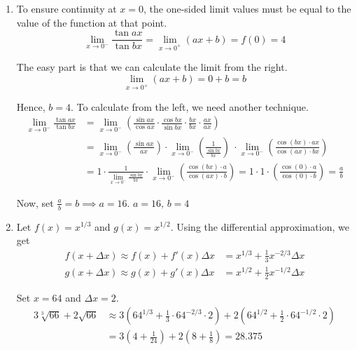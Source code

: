 \documentclass[a4paper, 12pt]{article}
\renewcommand{\headrulewidth}{0pt}
\begin{document}
\newpage
\pagestyle{fancy}
\renewcommand{\headrulewidth}{1pt}


\begin{enumerate}[leftmargin=*,label=\textbf{\arabic*.}]
\item To ensure continuity at $x=0$, the one-sided limit values must be equal to the value of the function at that point.
\[\lim_{x\to0^-} \frac{\tan ax}{\tan bx} = \lim_{x\to0^+} (ax+b) = f(0) = 4\]

\vspace{-0.5em}
The easy part is that we can calculate the limit from the right.
\[\lim_{x\to0^+} (ax+b) = 0+b = b\]

\vspace{-0.5em}
Hence, $b=4$. To calculate from the left, we need another technique.
\begin{align*}
\lim_{x\to0^-} \frac{\tan ax}{\tan bx} &= \lim_{x\to0^-} \left(\frac{\sin ax}{\cos ax} \cdot \frac{\cos bx}{\sin bx} \cdot \frac{bx}{bx}\cdot \frac{ax}{ax}\right)\\[1em]&=\lim_{x\to0^-} \left(\frac{\sin ax}{ax} \right)\cdot \lim_{x\to0^-} \left(\frac1{ \frac{\sin bx}{bx}}\right)\ \cdot \lim_{x\to0^-} \left(\frac{\cos (bx) \cdot ax}{\cos(ax) \cdot bx}\right)\\[1em]&=1\cdot  \frac1{\displaystyle \lim_{x\to0^-} \frac{\sin bx}{bx} }\cdot \lim_{x\to0^-} \left(\frac{\cos (bx) \cdot a}{\cos(ax) \cdot b}\right)= 1\cdot 1\cdot\left(\frac{\cos(0) \cdot a}{\cos(0) \cdot b}\right)=\frac ab
\end{align*}

\vspace{-1em}
Now, set $\displaystyle \frac ab = b\implies a= 16$. $\boxed{a=16,\,b=4}$

\item Let $f(x) = x^{1/3}$ and $g(x) = x^{1/2}$. Using the differential approximation, we get
\begin{align*}
f(x+\Delta x)\approx f(x) + f'(x)\Delta x&=x^{1/3}+\frac13x^{-2/3}\Delta x\\
g(x+\Delta x)\approx g(x) + g'(x)\Delta x&=x^{1/2}+\frac12x^{-1/2}\Delta x
\end{align*}

Set $x = 64$ and $\Delta x = 2$.
\begin{align*}
3\sqrt[3]{66}+2\sqrt{66}&\approx3\left(64^{1/3}+\frac13\cdot64^{-2/3}\cdot2\right)+2\left(64^{1/2}+\frac{1}2\cdot64^{-1/2}\cdot2\right)\\[1em]&=3\left(4+\frac1{24}\right)+2\left(8+\frac18\right)=\boxed{28.375}\end{align*}


\end{enumerate}
\end{document}
